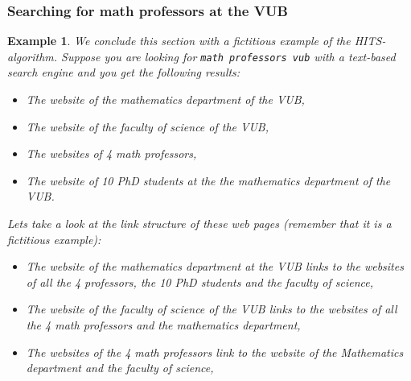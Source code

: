 \documentclass[a4paper,11pt]{report}
\newtheorem{example}[theorem]{Example}
\begin{document}
 \subsubsection{Searching for math professors at the VUB}
\begin{example}
  We conclude this section with a fictitious example of the HITS-algorithm. Suppose you 
  are looking for \texttt{math professors vub} with a text-based search engine 
  and you get the following results:
  \begin{itemize}
    \item The website of the mathematics department of the VUB,
       \item The website of the faculty of science of the VUB,
    \item The websites of 4 math professors,
    \item The website of 10 PhD students at the the mathematics department of the VUB.
  \end{itemize}
Lets take a look at the link structure of these web pages (remember that it is a fictitious example):
  \begin{itemize}
    \item The website of the mathematics department at the VUB links to the websites of all the 4 professors, 
    the 10 PhD students and the faculty of science,
   
      \item The website of the faculty of science of the VUB links to the websites 
    of all the 4 math professors and the mathematics department,
    
 \item The websites of the 4 math professors link to the website of the 
    Mathematics department and the faculty of science,


\end{itemize}
\end{example}
\end{document}
